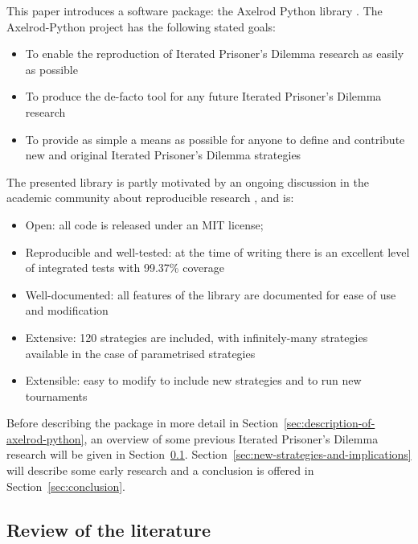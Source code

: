 \documentclass{article}
\begin{document}
This paper introduces a software package: the Axelrod Python library
\cite{Axelrod-Pythonprojectteam2015}. The Axelrod-Python project has the
following stated goals:

\begin{itemize}
    \item To enable the reproduction of Iterated Prisoner's Dilemma
    research as easily as possible
    \item To produce the de-facto tool for any future Iterated Prisoner's
    Dilemma research
    \item To provide as simple a means as possible for anyone to define and
    contribute new and original Iterated Prisoner's Dilemma strategies
\end{itemize}

The presented library is partly motivated by an ongoing discussion in the academic community
about reproducible research \cite{Crick2014a, Hong2015a, Prlic2012, Sandve2013},
and is:

\begin{itemize}
    \item Open: all code is released under an MIT license;
    \item Reproducible and well-tested: at the time of writing there is an excellent level of
        integrated tests with 99.37\% coverage
    \item Well-documented: all features of the library are documented for ease of
        use and modification
    \item Extensive: 120 strategies are included, with infinitely-many
        strategies available in the case of parametrised strategies
    \item Extensible: easy to modify to include new strategies and to run new tournaments
\end{itemize}

Before describing the package in more detail in
Section~\ref{sec:description-of-axelrod-python}, an overview of some previous
Iterated Prisoner's Dilemma research will be given in
Section~\ref{sec:review}. Section~\ref{sec:new-strategies-and-implications} will
describe some early research and a conclusion is offered in
Section~\ref{sec:conclusion}.

\subsection{Review of the literature}\label{sec:review}
\end{document}
